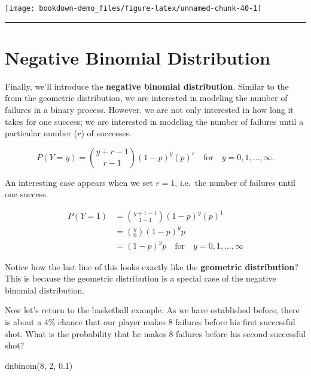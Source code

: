 \documentclass[
]{book}
\newenvironment{Shaded}{\begin{snugshade}}{\end{snugshade}}
\newcommand{\DecValTok}[1]{\textcolor[rgb]{0.00,0.00,0.81}{#1}}
\newcommand{\FloatTok}[1]{\textcolor[rgb]{0.00,0.00,0.81}{#1}}
\newcommand{\FunctionTok}[1]{\textcolor[rgb]{0.00,0.00,0.00}{#1}}
\newcommand{\NormalTok}[1]{#1}
\begin{document}
\begin{center}\texttt{[image: bookdown-demo\_files/figure-latex/unnamed-chunk-40-1]} \end{center}

\begin{center}\rule{0.5\linewidth}{0.5pt}\end{center}

\hypertarget{negative-binomial-distribution}{%
\section{Negative Binomial Distribution}\label{negative-binomial-distribution}}

Finally, we'll introduce the \textbf{negative binomial distribution}. Similar to the from the geometric distribution, we are interested in modeling the number of failures in a binary process. However, we are not only interested in how long it takes for one success; we are interested in modeling the number of failures until a particular number (\(r\)) of successes.

\[
\begin{equation}
P(Y=y) = \binom{y + r - 1}{r-1} (1-p)^{y}(p)^r \quad \textrm{for}\quad y = 0, 1, \ldots, \infty.
\end{equation}
\]

An interesting case appears when we set \(r=1\), i.e.~the number of failures until one success.

\[
\begin{split}
P(Y=1) &= \binom{y + 1 - 1}{1-1} (1-p)^{y} (p)^1 \\ &= \binom{y}{0} (1-p)^yp \\ &=(1-p)^yp \quad \textrm{for} \quad y = 0, 1, \ldots, \infty
\end{split}
\]

Notice how the last line of this looks exactly like the \textbf{geometric distribution}? This is because the geometric distribution is a special case of the negative binomial distribution.

Now let's return to the basketball example. As we have established before, there is about a 4\% chance that our player makes 8 failures before his first successful shot. What is the probability that he makes 8 failures before his second successful shot?

\begin{Shaded}
\begin{Highlighting}[]
\FunctionTok{dnbinom}\NormalTok{(}\DecValTok{8}\NormalTok{, }\DecValTok{2}\NormalTok{, }\FloatTok{0.1}\NormalTok{)}
\end{Highlighting}
\end{Shaded}
\end{document}
